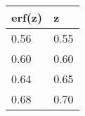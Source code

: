 \begin{tabular}{ m{3em} m{2em}}
    \hline
    \textbf{erf(z)} & \textbf{z}\\
    \hline
    0.56 & 0.55\\
    \hline
    0.60 & 0.60\\
    \hline
    0.64 & 0.65\\
    \hline
    0.68 & 0.70\\
    \hline

\end{tabular}